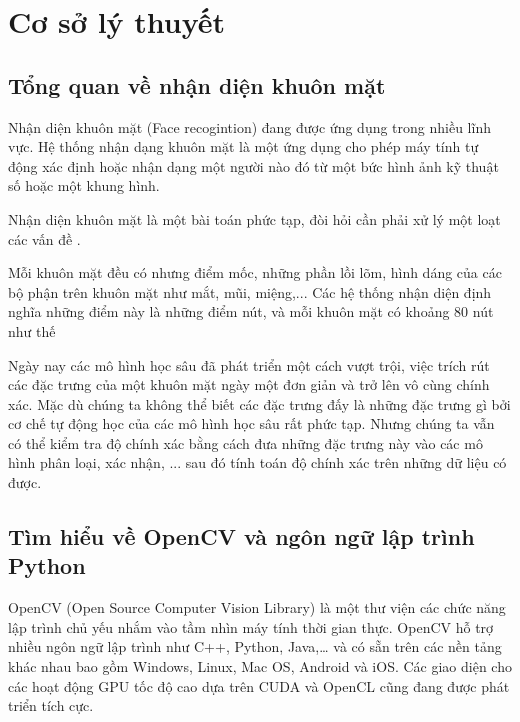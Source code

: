 \chapter{Cơ sở lý thuyết}
\label{cha:chap2}

\section{Tổng quan về nhận diện khuôn mặt}

Nhận diện khuôn mặt (Face recogintion) đang được ứng dụng trong nhiều lĩnh vực.
Hệ thống nhận dạng khuôn mặt là một ứng dụng cho phép máy tính tự động xác định
hoặc nhận dạng một người nào đó từ một bức hình ảnh kỹ thuật số hoặc một khung
hình.

Nhận diện khuôn mặt là một bài toán phức tạp, đòi hỏi cần phải xử lý một
loạt các vấn đề .

Mỗi khuôn mặt đều có nhưng điểm mốc, những phần lồi lõm, hình dáng của các
bộ phận trên khuôn mặt như mắt, mũi, miệng,... Các hệ thống nhận diện định
nghĩa những điểm này là những điểm nút, và mỗi khuôn mặt có khoảng 80 nút như thế

Ngày nay các mô hình học sâu đã phát triển một cách vượt trội, việc trích rút các đặc trưng của một
khuôn mặt ngày một đơn giản và trở lên vô cùng chính xác. Mặc dù chúng ta không thể biết các đặc trưng đấy
là những đặc trưng gì bởi cơ chế tự động học của các mô hình học sâu rất phức tạp. Nhưng chúng ta vẫn có thể
kiểm tra độ chính xác bằng cách đưa những đặc trưng này vào các mô hình phân loại, xác nhận, ... sau đó
tính toán độ chính xác trên những dữ liệu có được.


\section{Tìm hiểu về OpenCV và ngôn ngữ lập trình Python}

OpenCV (Open Source Computer Vision Library) là một thư viện các chức năng lập
trình chủ yếu nhắm vào tầm nhìn máy tính thời gian thực. OpenCV hỗ trợ nhiều ngôn
ngữ lập trình như C++, Python, Java,… và có sẵn trên các nền tảng khác nhau bao
gồm Windows, Linux, Mac OS, Android và iOS. Các giao diện cho các hoạt động
GPU tốc độ cao dựa trên CUDA và OpenCL cũng đang được phát triển tích cực.

